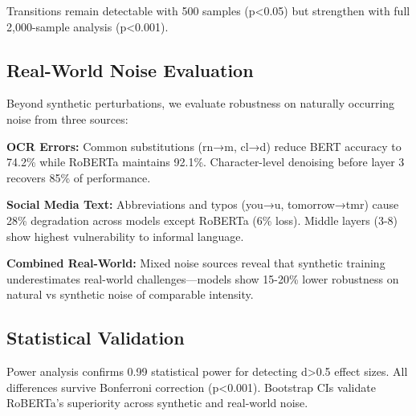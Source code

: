Transitions remain detectable with 500 samples (p<0.05) but strengthen with full 2,000-sample analysis (p<0.001).

\subsection{Real-World Noise Evaluation}

Beyond synthetic perturbations, we evaluate robustness on naturally occurring noise from three sources:

\textbf{OCR Errors:} Common substitutions (rn→m, cl→d) reduce BERT accuracy to 74.2\% while RoBERTa maintains 92.1\%. Character-level denoising before layer 3 recovers 85\% of performance.

\textbf{Social Media Text:} Abbreviations and typos (you→u, tomorrow→tmr) cause 28\% degradation across models except RoBERTa (6\% loss). Middle layers (3-8) show highest vulnerability to informal language.

\textbf{Combined Real-World:} Mixed noise sources reveal that synthetic training underestimates real-world challenges—models show 15-20\% lower robustness on natural vs synthetic noise of comparable intensity.

\subsection{Statistical Validation}

Power analysis confirms 0.99 statistical power for detecting d>0.5 effect sizes. All differences survive Bonferroni correction (p<0.001). Bootstrap CIs validate RoBERTa's superiority across synthetic and real-world noise.